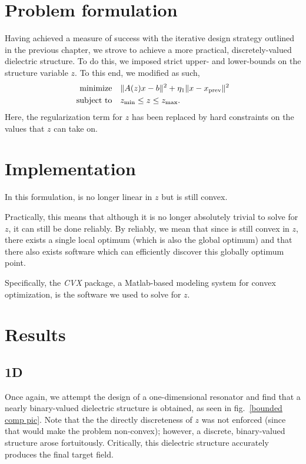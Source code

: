 \section{Problem formulation}
Having achieved a measure of success with the iterative design strategy
    outlined in the previous chapter,
    we strove 
    to achieve a more practical, discretely-valued dielectric structure. 
To do this, we imposed strict upper- and lower-bounds on the structure variable $z$. 
To this end, we modified  as such,
    \begin{subequations}
    \begin{align} 
    \operatorname*{\text{minimize}\quad} & \|A(z)x - b\|^2 + \eta_1\|x - x_\text{prev}\|^2\\
    \text{subject to}\quad & z_\text{min} \le z \le z_\text{max}. 
    \end{align}\label{bounded problem}
    \end{subequations}
Here, the regularization term for $z$ has been replaced by hard constraints
    on the values that $z$ can take on.

\section{Implementation} 
In this formulation,  is no longer linear in $z$
    but is still convex\cite{Boyd04}.

Practically, this means that although it is no longer absolutely trivial
    to solve  for $z$, it can still be done reliably.
By reliably, we mean that since  is still convex in $z$,
    there exists a single local optimum (which is also the global optimum)
    and that there also exists software which can efficiently
    discover this globally optimum point.

Specifically, the \emph{CVX} package\cite{Grant09}, 
    a Matlab-based modeling system for convex optimization, 
    is the software we used to solve  for $z$.

\section{Results}
\subsection{1D}
Once again, we attempt the design of a one-dimensional resonator
    and find that a nearly binary-valued dielectric structure is obtained,
    as seen in fig.~\ref{bounded comp pic}\cite{Lu10}.
Note that the the directly discreteness of $z$ was not enforced (since that would make the problem non-convex); 
    however, a discrete, binary-valued structure arose fortuitously. 
Critically, this dielectric structure accurately produces the final target field. 

